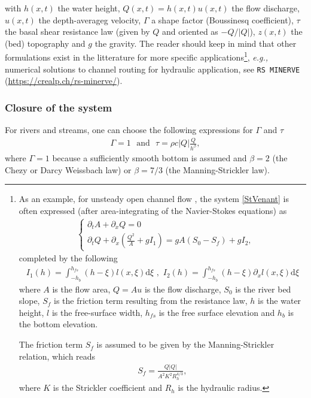 \documentclass[a4paper]{article}
\numberwithin{equation}{section}
\newcommand{\eg}{\textit{e.g.,} }
\begin{document}
	with $h(x,t)$ the water height, $Q(x,t)=h(x,t)u(x,t)$ the flow discharge, $u(x,t)$ the depth-averageg velocity, $\Gamma$ a shape factor (Boussinesq coefficient), $\tau$ the basal shear resistance law (given by $Q$ and oriented as $-Q/|Q|$), $z(x,t)$ the (bed) topography and $g$ the gravity. The reader should keep in mind that other formulations exist in the litterature for more specific applications\footnote{
	As an example, for unsteady open channel flow \parencite{kerger2011,hodges2019}, the system  \ref{StVenant} is often expressed (after area-integrating of the Navier-Stokes equations) as
	\begin{align}
	\label{StVenantOpenChannel}
	&\begin{cases}
		\partial_t A + \partial_xQ = 0 \\
		\partial_t Q + \partial_x \left(  \frac{Q^2}{A}+gI_1 \right) = gA(S_0-S_f)+gI_2,
	\end{cases}
	 \end{align}
 	completed by the following
	 \begin{align}
	 I_1(h)=\int_{-h_b}^{h_{fs}}(h-\xi)l(x,\xi)\mathrm{d}\xi \,\,,\,\, I_2(h)=\int_{-h_b}^{h_{fs}}(h-\xi) \partial_x l(x,\xi) \mathrm{d}\xi
	\end{align}	
	where $A$ is the flow area, $Q=Au$ is the flow discharge, $S_0$ is the river bed slope, $S_f$ is the friction term resulting from the resistance law, $h$ is the water height, $l$ is the free-surface width, $h_{fs}$ is the free surface elevation and $h_b$ is the bottom elevation. 
	
	The friction term $S_f$ is assumed to be given by the Manning-Strickler relation, which reads
	\begin{align}
		S_f = \frac{Q|Q|}{A^2K^2R_h^{4/3}},
	\end{align}
	where $K$ is the Strickler coefficient and $R_h$ is the hydraulic radius.
	}, \eg numerical solutions to channel routing for hydraulic application, see \texttt{RS MINERVE} (\url{https://crealp.ch/rs-minerve/}).
	\subsubsection{Closure of the system}
	For rivers and streams, one can choose the following expressions for $\Gamma$ and $\tau$
	\begin{align}
		\Gamma = 1 \,\,\,\, \mathrm{and} \,\,\,\, \tau = \rho c |Q| \frac{Q}{h^{\beta}},
	\end{align}
	where $\Gamma=1$ because a sufficiently smooth bottom is assumed and $\beta=2$ (the Chezy or Darcy Weissbach law) or $\beta=7/3$ (the Manning-Strickler law).
	
\end{document}
